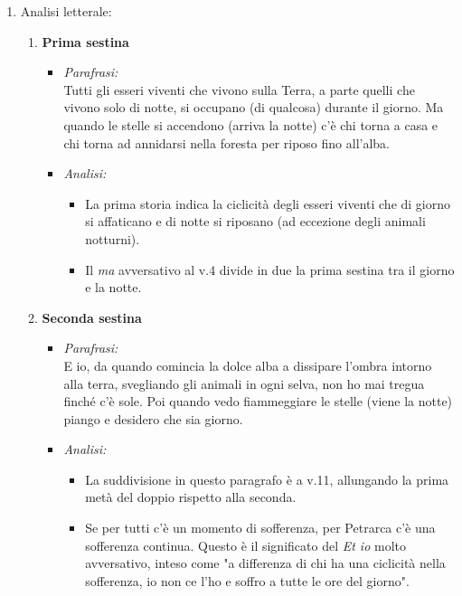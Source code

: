 \documentclass{article}
\begin{document}
\begin{enumerate}
    \item Analisi letterale:
        \begin{enumerate}[label=]
            \item \textbf{Prima sestina}
                \begin{itemize}[label=]
                    \item \textit{Parafrasi:}\\
                        Tutti gli esseri viventi che vivono sulla Terra, a parte quelli che vivono solo di notte, si occupano (di qualcosa) durante il giorno. Ma quando le stelle si accendono (arriva la notte) c'è chi torna a casa e chi torna ad annidarsi nella foresta per riposo fino all'alba.
                    \item \textit{Analisi:}
                        \begin{itemize}
                            \item La prima storia indica la ciclicità degli esseri viventi che di giorno si affaticano e di notte si riposano (ad eccezione degli animali notturni).
                            \item Il \textit{ma} avversativo al v.4 divide in due la prima sestina tra il giorno e la notte.
                        \end{itemize}
                \end{itemize}
            \item \textbf{Seconda sestina}
                \begin{itemize}[label=]
                    \item \textit{Parafrasi:}\\
                        E io, da quando comincia la dolce alba a dissipare l'ombra intorno alla terra, svegliando gli animali in ogni selva, non ho mai tregua finché c'è sole. Poi quando vedo fiammeggiare le stelle (viene la notte) piango e desidero che sia giorno.
                    \item \textit{Analisi:}
                        \begin{itemize}
                            \item La suddivisione in questo paragrafo è a v.11, allungando la prima metà del doppio rispetto alla seconda.
                            \item Se per tutti c'è un momento di sofferenza, per Petrarca c'è una sofferenza continua. Questo è il significato del \textit{Et io} molto avversativo, inteso come "a differenza di chi ha una ciclicità nella sofferenza, io non ce l'ho e soffro a tutte le ore del giorno".

\end{itemize}
\end{itemize}
\end{enumerate}
\end{enumerate}
\end{document}
